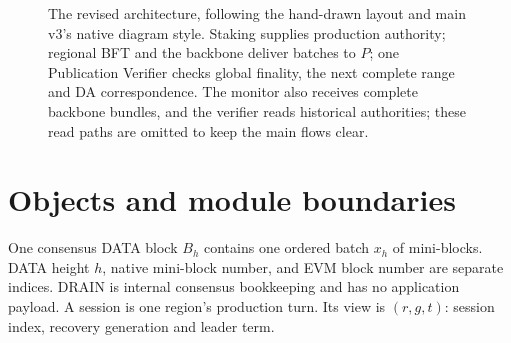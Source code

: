 \documentclass[11pt,a4paper]{article}
\begin{document}
\begin{figure}[H]

\caption{The revised architecture, following the hand-drawn layout and
main v3's native diagram style. Staking supplies production authority;
regional BFT and the backbone deliver batches to $P$; one Publication
Verifier checks global finality, the next complete range and DA
correspondence. The monitor also receives complete backbone bundles,
and the verifier reads historical authorities;
these read paths are omitted to keep the main flows clear.}
\label{fig:architecture}
\end{figure}

\section{Objects and module boundaries}\label{sec:objects}
One consensus DATA block $B_h$ contains one ordered batch $x_h$ of
mini-blocks. DATA height $h$, native mini-block number, and EVM block
number are separate indices. DRAIN is internal consensus bookkeeping and
has no application payload. A session is one region's production turn.
Its view is $(r,g,t)$: session index, recovery generation and leader term.
\end{document}

